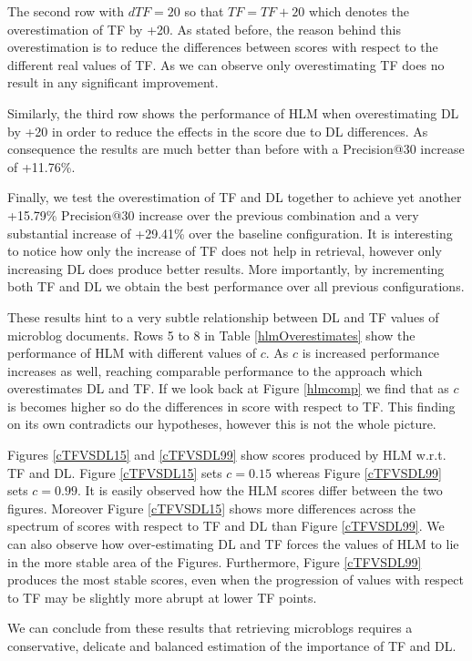 The second row with $dTF = 20$ so that $TF = TF+20$ which denotes the overestimation of TF by +20. As stated before, the reason behind this overestimation is to reduce the differences between scores with respect to the different real values of TF. As we can observe only overestimating TF does no result in any significant improvement.

Similarly, the third row shows the performance of HLM when overestimating DL by +20 in order to reduce the effects in the score due to DL differences. As consequence the results are much better than before with a Precision@30 increase of +11.76\%. 

Finally, we test the overestimation of TF and DL together to achieve yet another +15.79\% Precision@30 increase over the previous combination and a very substantial increase of +29.41\% over the baseline configuration. It is interesting to notice how only the increase of TF does not help in retrieval, however only increasing DL does produce better results. More importantly, by incrementing both TF and DL we obtain the best performance over all previous configurations.

These results hint to a very subtle relationship between DL and TF values of microblog documents. Rows 5 to 8 in Table \ref{hlmOverestimates} show the performance of HLM with different values of $c$. As $c$ is increased performance increases as well, reaching comparable performance to the approach which overestimates DL and TF. If we look back at Figure \ref{hlmcomp} we find that as $c$ is becomes higher so do the differences in score with respect to TF. This finding on its own contradicts our hypotheses, however this is not the whole picture.


Figures \ref{cTFVSDL15} and \ref{cTFVSDL99} show scores produced by HLM w.r.t. TF and DL. Figure \ref{cTFVSDL15} sets $c=0.15$ whereas Figure \ref{cTFVSDL99} sets $c=0.99$. It is easily observed how the HLM scores differ between the two figures. Moreover Figure \ref{cTFVSDL15} shows more differences across the spectrum of scores with respect to TF and DL than Figure \ref{cTFVSDL99}. We can also observe how over-estimating DL and TF forces the values of HLM to lie in the more stable area of the Figures. Furthermore, Figure \ref{cTFVSDL99} produces the most stable scores, even when the progression of values with respect to TF may be slightly more abrupt at lower TF points.

We can conclude from these results that retrieving microblogs requires a conservative, delicate and balanced estimation of the importance of TF and DL.

